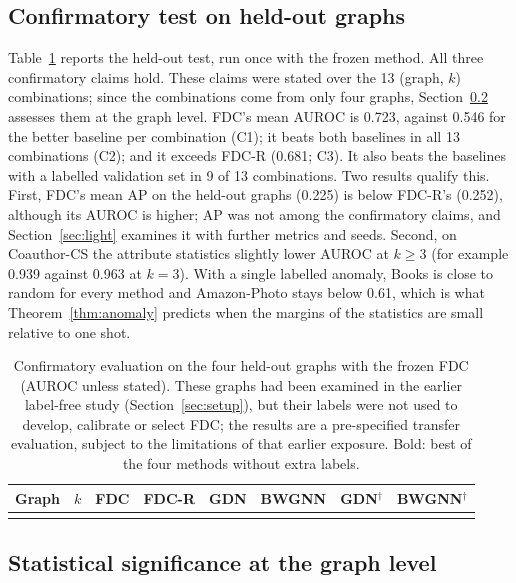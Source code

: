 \documentclass[pdflatex,sn-mathphys-ay]{sn-jnl}
\theoremstyle{plain}
\theoremstyle{remark}
\begin{document}
\subsection{Confirmatory test on held-out graphs}\label{sec:heldout}

Table~\ref{tab:heldout} reports the held-out test, run once with the frozen method. All three confirmatory claims hold. These claims were stated over the 13 (graph, $k$) combinations; since the combinations come from only four graphs, Section~\ref{sec:signif} assesses them at the graph level. FDC's mean AUROC is 0.723, against 0.546 for the better baseline per combination (C1); it beats both baselines in all 13 combinations (C2); and it exceeds FDC-R (0.681; C3). It also beats the baselines with a labelled validation set in 9 of 13 combinations. Two results qualify this. First, FDC's mean AP on the held-out graphs (0.225) is below FDC-R's (0.252), although its AUROC is higher; AP was not among the confirmatory claims, and Section~\ref{sec:light} examines it with further metrics and seeds. Second, on Coauthor-CS the attribute statistics slightly lower AUROC at $k\ge3$ (for example 0.939 against 0.963 at $k=3$). With a single labelled anomaly, Books is close to random for every method and Amazon-Photo stays below 0.61, which is what Theorem~\ref{thm:anomaly} predicts when the margins of the statistics are small relative to one shot.

\begin{table}[!ht]
\caption{Confirmatory evaluation on the four held-out graphs with the frozen FDC (AUROC unless stated). These graphs had been examined in the earlier label-free study (Section~\ref{sec:setup}), but their labels were not used to develop, calibrate or select FDC; the results are a pre-specified transfer evaluation, subject to the limitations of that earlier exposure. Bold: best of the four methods without extra labels.}
\label{tab:heldout}
\footnotesize
\begin{tabular*}{\textwidth}{@{\extracolsep{\fill}}lccccccc@{}}
\toprule
Graph & $k$ & FDC & FDC-R & GDN & BWGNN & GDN$^{\dagger}$ & BWGNN$^{\dagger}$ \\
\midrule

\botrule
\end{tabular*}
\end{table}

\subsection{Statistical significance at the graph level}\label{sec:signif}
\end{document}

